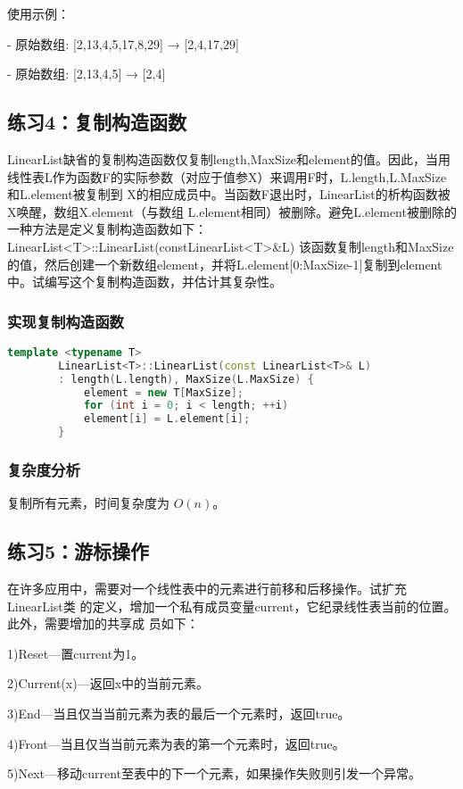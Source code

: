 \documentclass[UTF8]{ctexart}
\begin{document}
	使用示例：
	
	- 原始数组: [2,13,4,5,17,8,29] → [2,4,17,29]
	
	- 原始数组: [2,13,4,5] → [2,4]
	\subsection{练习4：复制构造函数}
	LinearList缺省的复制构造函数仅复制length,MaxSize和element的值。因此，当用线性表L作为函数F的实际参数（对应于值参X）来调用F时，L.length,L.MaxSize和L.element被复制到
	X的相应成员中。当函数F退出时，LinearList的析构函数被X唤醒，数组X.element（与数组
	L.element相同）被删除。避免L.element被删除的一种方法是定义复制构造函数如下：
	LinearList<T>::LinearList(constLinearList<T>\&L)
	该函数复制length和MaxSize的值，然后创建一个新数组element，并将L.element[0:MaxSize-1]复制到element中。试编写这个复制构造函数，并估计其复杂性。
	
	\subsubsection{实现复制构造函数}
	
	\begin{lstlisting}[language=C++]
		template <typename T>
		LinearList<T>::LinearList(const LinearList<T>& L)
		: length(L.length), MaxSize(L.MaxSize) {
			element = new T[MaxSize];
			for (int i = 0; i < length; ++i)
			element[i] = L.element[i];
		}
	\end{lstlisting}
	\subsubsection{复杂度分析}
	
	复制所有元素，时间复杂度为 $ O(n) $。
	\subsection{练习5：游标操作}
	在许多应用中，需要对一个线性表中的元素进行前移和后移操作。试扩充LinearList类
	的定义，增加一个私有成员变量current，它纪录线性表当前的位置。此外，需要增加的共享成
	员如下：
	
	1)Reset—置current为1。
	
	2)Current(x)—返回x中的当前元素。
	
	3)End—当且仅当当前元素为表的最后一个元素时，返回true。
	
	4)Front—当且仅当当前元素为表的第一个元素时，返回true。
	
	5)Next—移动current至表中的下一个元素，如果操作失败则引发一个异常。
	
\end{document}
